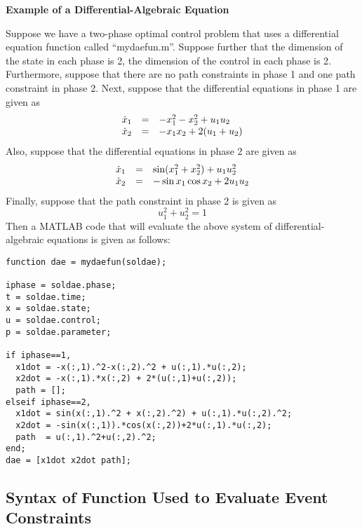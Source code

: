 \documentclass[10pt,final]{report}
\newenvironment{shadedframe}{%
  \def\FrameCommand{\fcolorbox{black}{shadecolor}}%
  \MakeFramed {\FrameRestore}}
{\endMakeFramed}
\begin{document}
\begin{shadedframe}
  {\noindent}{\bf Example of a Differential-Algebraic Equation}
\vspace{12pt}

Suppose we have a two-phase optimal control problem that uses a differential
equation function called ``mydaefun.m''.  Suppose further that the dimension
of the state in each phase is 2, the dimension of the control in each
phase is 2.  Furthermore, suppose that there are no path constraints
in phase 1 and one path constraint in phase 2.  Next, suppose that
the differential equations in phase 1 are given as
\begin{displaymath}
  \begin{array}{lcl}
    \dot{x}_1 & = & -x_1^2-x_2^2 + u_1 u_2 \\
    \dot{x}_2 & = & -x_1x_2 + 2(u_1+u_2)
  \end{array}
\end{displaymath}
Also, suppose that the differential equations in phase 2 are given as
\begin{displaymath}
  \begin{array}{lcl}
    \dot{x}_1 & = & \sin(x_1^2+x_2^2) + u_1 u_2^2 \\
    \dot{x}_2 & = & -\sin x_1 \cos x_2 + 2u_1u_2
  \end{array}
\end{displaymath}
Finally, suppose that the path constraint in phase 2 is given as
\begin{displaymath}
  u_1^2+u_2^2 = 1
\end{displaymath}
Then a MATLAB code that will evaluate the above system of
differential-algebraic equations is given as follows:
\begin{verbatim}
function dae = mydaefun(soldae);

iphase = soldae.phase;
t = soldae.time;
x = soldae.state;
u = soldae.control;
p = soldae.parameter;

if iphase==1,
  x1dot = -x(:,1).^2-x(:,2).^2 + u(:,1).*u(:,2);
  x2dot = -x(:,1).*x(:,2) + 2*(u(:,1)+u(:,2));
  path = [];
elseif iphase==2,
  x1dot = sin(x(:,1).^2 + x(:,2).^2) + u(:,1).*u(:,2).^2;
  x2dot = -sin(x(:,1)).*cos(x(:,2))+2*u(:,1).*u(:,2);
  path  = u(:,1).^2+u(:,2).^2;
end;
dae = [x1dot x2dot path];
\end{verbatim}

\end{shadedframe}

\subsection{Syntax of Function Used to Evaluate Event Constraints\label{sect:_Event_syntax}}
\end{document}
